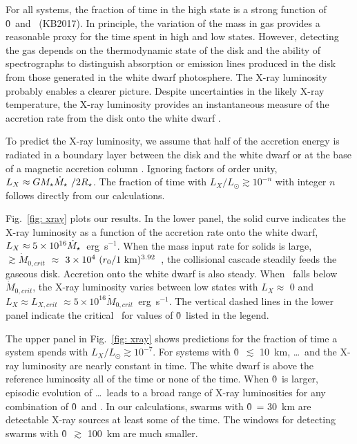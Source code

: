 \documentclass[12pt,preprint]{aastex}
\begin{document}
For all systems, the fraction of time in the high state is a strong function of \r0\ and 
\mdotz\ (KB2017). In principle, the variation of the mass in gas provides a reasonable 
proxy for the time spent in high and low states. However, detecting the gas depends on the 
thermodynamic state of the disk and the ability of spectrographs to distinguish absorption 
or emission lines produced in the disk from those generated in the white dwarf photosphere. 
The X-ray luminosity probably enables a clearer picture. Despite uncertainties in the likely
X-ray temperature, the X-ray luminosity provides an instantaneous measure of the accretion 
rate from the disk onto the white dwarf \citep[e.g.,][and references therein]{kuulkers2006,
pretorius2012,reis2013}.

To predict the X-ray luminosity, we assume that half of the accretion energy is radiated in a
boundary layer between the disk and the white dwarf \citep[e.g.,][]{lbp1974} or at the base 
of a magnetic accretion column \citep[e.g.,][]{ghosh1979}. Ignoring factors of order unity, 
$L_X \approx G M_\star \mdots\ / 2 R_\star$.  The fraction of time with 
$L_X / L_\odot \gtrsim 10^{-n}$ with integer $n$ follows directly from our calculations.

Fig.~\ref{fig: xray} plots our results. In the lower panel, the solid curve indicates the 
X-ray luminosity as a function of the accretion rate onto the white dwarf, 
$L_X \approx 5 \times 10^{16} \mdots$~erg~s$^{-1}$.  When the mass input rate for solids 
is large, 
\mdotz\ $\gtrsim \dot{M}_{0, crit}$ $\approx$ $3 \times 10^4 ~ (r_0 / {\rm 1~km})^{3.92}$~\gs,
the collisional cascade steadily feeds the gaseous disk. Accretion onto the white dwarf 
is also steady. When \mdotz\ falls below $\dot{M}_{0, crit}$, the X-ray luminosity varies 
between low states with $L_X \approx$ 0 and $L_X \approx L_{X, crit}$ 
$ \approx 5 \times 10^{16} \dot{M}_{0, crit}$~erg~s$^{-1}$. The vertical dashed lines in 
the lower panel indicate the critical \mdotz\ for values of \r0\ listed in the legend. 

The upper panel in Fig.~\ref{fig: xray} shows predictions for the fraction of time a system 
spends with $L_X / L_\odot \gtrsim 10^{-7}$.  For systems with \r0\ $\lesssim$ 10~km, 
\mdots\ and the X-ray luminosity are nearly constant in time. The white dwarf is above 
the reference luminosity all of the time or none of the time. When \r0\ is larger,
episodic evolution of \mdots\ leads to a broad range of X-ray luminosities for any
combination of \r0\ and \mdotz. In our calculations, swarms with \r0\ = 30~km are 
detectable X-ray sources at least some of the time. The windows for detecting swarms
with \r0\ $\gtrsim$ 100~km are much smaller.
\end{document}
